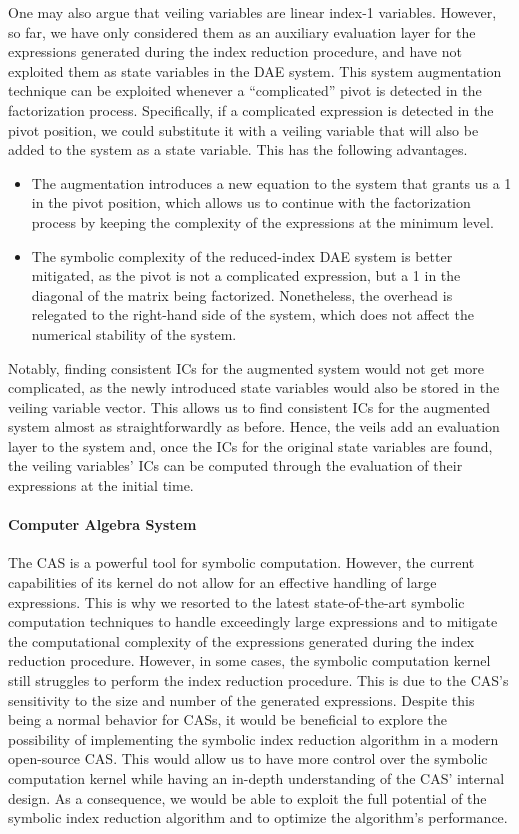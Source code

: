 One may also argue that veiling variables are linear index-1 variables. However, so far, we have only considered them as an auxiliary evaluation layer for the expressions generated during the index reduction procedure, and have not exploited them as state variables in the \ac{DAE} system. This system augmentation technique can be exploited whenever a ``complicated'' pivot is detected in the factorization process. Specifically, if a complicated expression is detected in the pivot position, we could substitute it with a veiling variable that will also be added to the system as a state variable. This has the following advantages.
%
\begin{itemize}
  \setlength{\itemsep}{0.0em}
  \item The augmentation introduces a new equation to the system that grants us a 1 in the pivot position, which allows us to continue with the factorization process by keeping the complexity of the expressions at the minimum level.
  \item The symbolic complexity of the reduced-index \ac{DAE} system is better mitigated, as the pivot is not a complicated expression, but a 1 in the diagonal of the matrix being factorized. Nonetheless, the overhead is relegated to the right-hand side of the system, which does not affect the numerical stability of the system.
\end{itemize}
%
Notably, finding consistent \acp{IC} for the augmented system would not get more complicated, as the newly introduced state variables would also be stored in the veiling variable vector. This allows us to find consistent \acp{IC} for the augmented system almost as straightforwardly as before. Hence, the veils add an evaluation layer to the system and, once the \acp{IC} for the original state variables are found, the veiling variables' \acp{IC} can be computed through the evaluation of their expressions at the initial time.

\paragraph{Computer Algebra System}

The \Maple{} \ac{CAS} is a powerful tool for symbolic computation. However, the current capabilities of its kernel do not allow for an effective handling of large expressions. This is why we resorted to the latest state-of-the-art symbolic computation techniques to handle exceedingly large expressions and to mitigate the computational complexity of the expressions generated during the index reduction procedure. However, in some cases, the \Maple{} symbolic computation kernel still struggles to perform the index reduction procedure. This is due to the \ac{CAS}'s sensitivity to the size and number of the generated expressions. Despite this being a normal behavior for \acp{CAS}, it would be beneficial to explore the possibility of implementing the symbolic index reduction algorithm in a modern open-source \ac{CAS}. This would allow us to have more control over the symbolic computation kernel while having an in-depth understanding of the \ac{CAS}' internal design. As a consequence, we would be able to exploit the full potential of the symbolic index reduction algorithm and to optimize the algorithm's performance.

